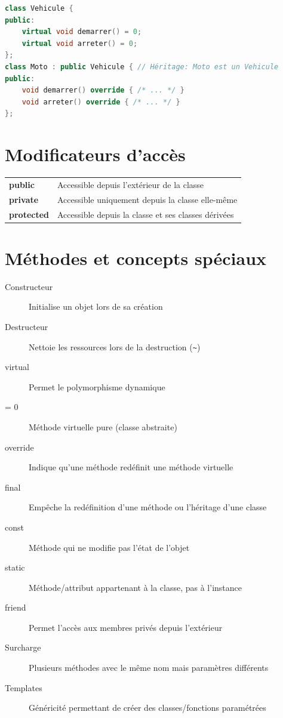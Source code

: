 \documentclass[9pt]{extarticle}
\begin{document}
\begin{multicols*}{3}
\begin{lstlisting}[language=C++]
class Vehicule {
public:
    virtual void demarrer() = 0;
    virtual void arreter() = 0;
};
class Moto : public Vehicule { // Héritage: Moto est un Vehicule
public:
    void demarrer() override { /* ... */ }
    void arreter() override { /* ... */ }
};
\end{lstlisting}
\section*{Modificateurs d'accès}
\begin{tabularx}{\columnwidth}{lX}
\textbf{public} & Accessible depuis l'extérieur de la classe \\
\textbf{private} & Accessible uniquement depuis la classe elle-même \\
\textbf{protected} & Accessible depuis la classe et ses classes dérivées
\end{tabularx}

\section*{Méthodes et concepts spéciaux}
\begin{description}
\item[Constructeur] Initialise un objet lors de sa création
\item[Destructeur] Nettoie les ressources lors de la destruction (\texttt{\textasciitilde{}})
\item[virtual] Permet le polymorphisme dynamique
\item[= 0] Méthode virtuelle pure (classe abstraite)
\item[override] Indique qu'une méthode redéfinit une méthode virtuelle
\item[final] Empêche la redéfinition d'une méthode ou l'héritage d'une classe
\item[const] Méthode qui ne modifie pas l'état de l'objet
\item[static] Méthode/attribut appartenant à la classe, pas à l'instance
\item[friend] Permet l'accès aux membres privés depuis l'extérieur
\item[Surcharge] Plusieurs méthodes avec le même nom mais paramètres différents
\item[Templates] Généricité permettant de créer des classes/fonctions paramétrées
\end{description}


\end{multicols*}
\end{document}
